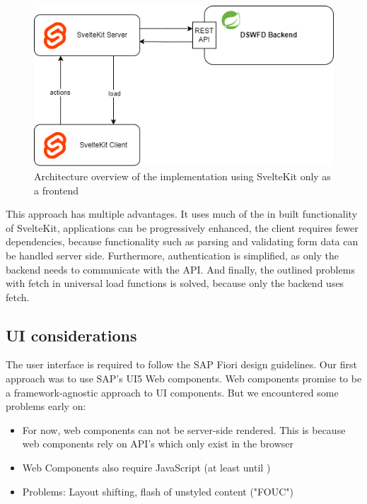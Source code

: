 \begin{figure}[ht]
    \centering
    \includegraphics[width=.6\linewidth]{assets/fe-only-all-server}
    \caption{Architecture overview of the implementation using SvelteKit only as a frontend}
    \label{fig:dswfd-architecture-fe-through-server}
\end{figure}

This approach has multiple advantages. It uses much of the in built functionality of SvelteKit, applications can be progressively enhanced, the client requires fewer dependencies, because functionality such as parsing and validating form data can be handled server side. Furthermore, authentication is simplified, as only the backend needs to communicate with the API. And finally, the outlined problems with fetch in universal load functions is solved, because only the backend uses fetch.


\subsection{UI considerations}
\label{sec:implementation-ui}

The user interface is required to follow the SAP Fiori design guidelines. Our first approach was to use SAP's UI5 Web components. Web components promise to be a framework-agnostic approach to UI components. But we encountered some problems early on:

\begin{itemize}
    \item For now, web components can not be server-side rendered. This is because web components rely on API's which only exist in the browser
    \item Web Components also require JavaScript (at least until \cite{noauthor_declarative_2023})
    \item Problems: Layout shifting, flash of unstyled content ("FOUC")
\end{itemize}
